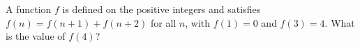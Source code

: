 A function $f$ is defined on the positive integers and satisfies $f(n)=f(n+1)+f(n+2)$ for all $n$, with $f(1)=0$ and $f(3)=4$. What is the value of $f(4)$?
